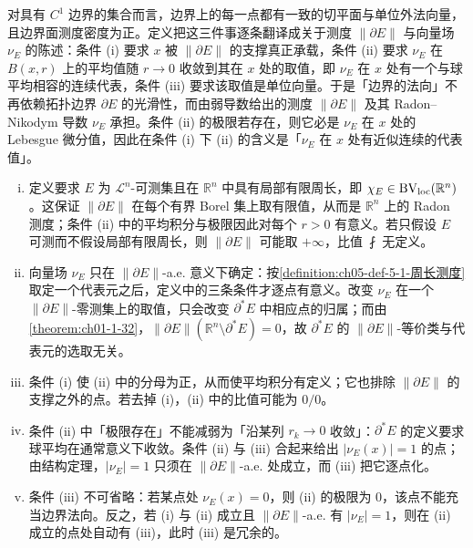 \documentclass[../../main.tex]{subfiles}%
\begin{document}
\begin{remark}\label{remark:ch05-def-5-4-动机}
对具有 $C^1$ 边界的集合而言，边界上的每一点都有一致的切平面与单位外法向量，且边界面测度密度为正。定义把这三件事逐条翻译成关于测度 $\lVert\partial E\rVert$ 与向量场 $\nu_E$ 的陈述：条件 (i) 要求 $x$ 被 $\lVert\partial E\rVert$ 的支撑真正承载，条件 (ii) 要求 $\nu_E$ 在 $B(x,r)$ 上的平均值随 $r\to0$ 收敛到其在 $x$ 处的取值，即 $\nu_E$ 在 $x$ 处有一个与球平均相容的连续代表，条件 (iii) 要求该取值是单位向量。于是「边界的法向」不再依赖拓扑边界 $\partial E$ 的光滑性，而由弱导数给出的测度 $\lVert\partial E\rVert$ 及其 Radon--Nikodym 导数 $\nu_E$ 承担。条件 (ii) 的极限若存在，则它必是 $\nu_E$ 在 $x$ 处的 Lebesgue 微分值，因此在条件 (i) 下 (ii) 的含义是「$\nu_E$ 在 $x$ 处有近似连续的代表值」。
\end{remark}

\begin{remark}\label{remark:ch05-def-5-4-条件}
\begin{enumerate}[(i)]
\item 定义要求 $E$ 为 $\mathcal{L}^n$-可测集且在 $\mathbb{R}^n$ 中具有局部有限周长，即 $\chi_E\in\mathrm{BV}_{\mathrm{loc}}(\mathbb{R}^n)$。这保证 $\lVert\partial E\rVert$ 在每个有界 Borel 集上取有限值，从而是 $\mathbb{R}^n$ 上的 Radon 测度；条件 (ii) 中的平均积分与极限因此对每个 $r>0$ 有意义。若只假设 $E$ 可测而不假设局部有限周长，则 $\lVert\partial E\rVert$ 可能取 $+\infty$，比值 $\fint$ 无定义。
\item 向量场 $\nu_E$ 只在 $\lVert\partial E\rVert$-a.e. 意义下确定：按\cref{definition:ch05-def-5-1-周长测度}取定一个代表元之后，定义中的三条条件才逐点有意义。改变 $\nu_E$ 在一个 $\lVert\partial E\rVert$-零测集上的取值，只会改变 $\partial^*E$ 中相应点的归属；而由\cref{theorem:ch01-1-32}，$\lVert\partial E\rVert(\mathbb{R}^n\setminus\partial^*E)=0$，故 $\partial^*E$ 的 $\lVert\partial E\rVert$-等价类与代表元的选取无关。 %
\item 条件 (i) 使 (ii) 中的分母为正，从而使平均积分有定义；它也排除 $\lVert\partial E\rVert$ 的支撑之外的点。若去掉 (i)，(ii) 中的比值可能为 $0/0$。
\item 条件 (ii) 中「极限存在」不能减弱为「沿某列 $r_k\to0$ 收敛」：$\partial^*E$ 的定义要求球平均在通常意义下收敛。条件 (ii) 与 (iii) 合起来给出 $\lvert\nu_E(x)\rvert=1$ 的点；由结构定理，$\lvert\nu_E\rvert=1$ 只须在 $\lVert\partial E\rVert$-a.e. 处成立，而 (iii) 把它逐点化。
\item 条件 (iii) 不可省略：若某点处 $\nu_E(x)=0$，则 (ii) 的极限为 $0$，该点不能充当边界法向。反之，若 (i) 与 (ii) 成立且 $\lVert\partial E\rVert$-a.e. 有 $\lvert\nu_E\rvert=1$，则在 (ii) 成立的点处自动有 (iii)，此时 (iii) 是冗余的。
\end{enumerate}
\end{remark}
\end{document}
